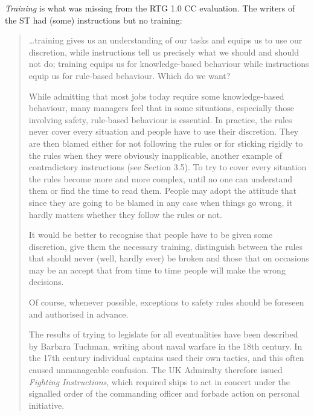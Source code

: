 \documentclass[a4paper]{article}
\begin{document}
\emph{Training} is what was missing from the RTG 1.0 CC evaluation.  The writers of the ST had
(some) instructions but no training:
\begin{quotation}
	\ldots training gives us an understanding of our tasks and equips us to use our discretion,
while instructions tell us precisely what we should and should not do; training equips us for
knowledge-based behaviour while instructions equip us for rule-based behaviour.  Which do we want?

	While admitting that most jobs today require some knowledge-based behaviour, many managers feel
that in some situations, especially those involving safety, rule-based behaviour is essential.  In
practice, the rules never cover every situation and people have to use their discretion.  They are
then blamed either for not following the rules or for sticking rigidly to the rules when they were
obviously inapplicable, another example of contradictory instructions (see Section 3.5).  To try to
cover every situation the rules become more and more complex, until no one can understand them or
find the time to read them.  People may adopt the attitude that since they are going to be blamed
in any case when things go wrong, it hardly matters whether they follow the rules or not.

	It would be better to recognise that people have to be given some discretion, give them the
necessary training, distinguish between the rules that should never (well, hardly ever) be broken
and those that on occasions may be an accept that from time to time people will make the wrong
decisions.

	Of course, whenever possible, exceptions to safety rules should be foreseen and authorised in
advance.

	The results of trying to legislate for all eventualities have been described by Barbara
Tuchman, writing about naval warfare in the 18th century.  In the 17th century individual captains
used their own tactics, and this often caused unmanageable confusion.  The UK Admiralty therefore
issued \emph{Fighting Instructions}, which required ships to act in concert under the signalled
order of the commanding officer and forbade action on personal initiative.


\end{quotation}
\end{document}
